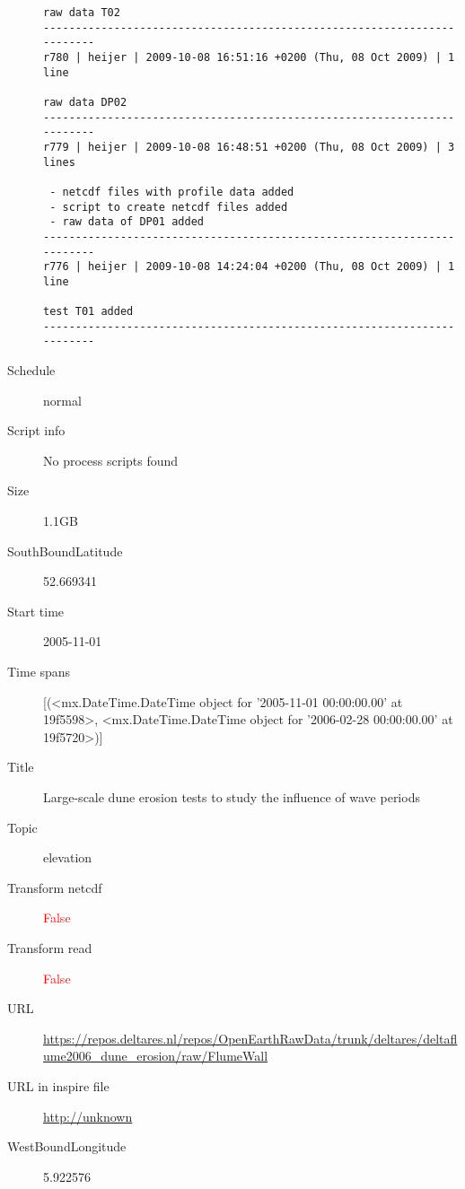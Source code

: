 \documentclass[9]{report}
\begin{document}
\begin{description}
\begin{verbatim}
raw data T02
------------------------------------------------------------------------
r780 | heijer | 2009-10-08 16:51:16 +0200 (Thu, 08 Oct 2009) | 1 line

raw data DP02
------------------------------------------------------------------------
r779 | heijer | 2009-10-08 16:48:51 +0200 (Thu, 08 Oct 2009) | 3 lines

 - netcdf files with profile data added
 - script to create netcdf files added
 - raw data of DP01 added
------------------------------------------------------------------------
r776 | heijer | 2009-10-08 14:24:04 +0200 (Thu, 08 Oct 2009) | 1 line

test T01 added
------------------------------------------------------------------------

\end{verbatim}
  \item[Schedule] normal
  \item[Script info] No process scripts found
  \item[Size] 1.1GB
  \item[SouthBoundLatitude] 52.669341
  \item[Start time] 2005-11-01
  \item[Time spans] [(<mx.DateTime.DateTime object for '2005-11-01 00:00:00.00' at 19f5598>, <mx.DateTime.DateTime object for '2006-02-28 00:00:00.00' at 19f5720>)]
  \item[Title]  Large-scale dune erosion tests to study the influence of wave periods 
  \item[Topic] elevation
  \item[Transform netcdf] \textcolor{red}{False}
  \item[Transform read] \textcolor{red}{False}
  \item[URL] \href{https://repos.deltares.nl/repos/OpenEarthRawData/trunk/deltares/deltaflume2006\_dune\_erosion/raw/FlumeWall}{https://repos.deltares.nl/repos/OpenEarthRawData/trunk/deltares/deltaflume2006\_dune\_erosion/raw/FlumeWall}
  \item[URL in inspire file] \href{http://unknown}{http://unknown}
  \item[WestBoundLongitude] 5.922576
\end{description}
\end{document}
